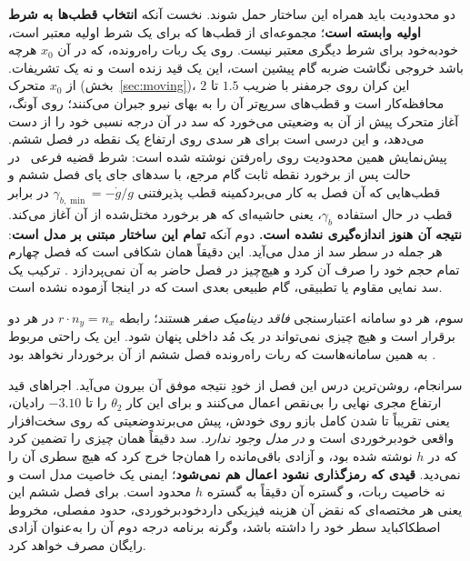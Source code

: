 \documentclass[10pt,twocolumn]{article}
\newcommand{\en}[1]{\lr{#1}}
\newcommand{\md}{\lr{\textemdash}}
\newcommand{\nd}{\lr{\textendash}}
\begin{document}
دو محدودیت باید همراه این ساختار حمل شوند. نخست آنکه \textbf{انتخاب قطب‌ها به
شرط اولیه وابسته است}؛ مجموعه‌ای از قطب‌ها که برای یک شرط اولیه معتبر است،
خودبه‌خود برای شرط دیگری معتبر نیست. روی یک ربات راه‌رونده، که در آن $x_0$ هرچه
باشد خروجی نگاشت ضربه گام پیشین است، این یک قید زنده است و نه یک تشریفات. از
$x_0$ متحرک (بخش~\ref{sec:moving})، این کران روی جرم\nd{}فنر با ضریب $1.5$ تا $2$
محافظه‌کار است و قطب‌های سریع‌تر آن را به بهای نیرو جبران می‌کنند؛ روی آونگ، آغاز
متحرک پیش از آن به وضعیتی می‌خورد که سد در آن درجه نسبی خود را از دست می‌دهد، و این
درسی است برای هر سدی روی ارتفاع یک نقطه در فصل ششم. پیش‌نمایش همین محدودیت روی راه‌رفتن
نوشته شده است: شرط قضیه فرعی~\en{5.2} در حالت پس از برخورد نقطه ثابت گام مرجع، با سدهای
جای پای فصل ششم و قطب‌هایی که آن فصل به کار می‌برد\md{}کمینه قطب پذیرفتنی
$\gamma_{b,\min}=-\dot g/g$ در برابر قطب در حال استفاده $\gamma_b$، یعنی حاشیه‌ای که هر
برخورد مختل‌شده از آن آغاز می‌کند. \textbf{نتیجه آن هنوز اندازه‌گیری نشده است.} دوم
آنکه \textbf{تمام این ساختار مبتنی بر مدل است}: هر جمله در سطر سد از مدل
می‌آید. این دقیقاً همان شکافی است که فصل چهارم تمام حجم خود را صرف آن کرد و
هیچ‌چیز در فصل حاضر به آن نمی‌پردازد \cite{xu2015robustness}. ترکیب یک سد نمایی
مقاوم یا تطبیقی، گام طبیعی بعدی است که در اینجا آزموده نشده است.

سوم، هر دو سامانه اعتبارسنجی \emph{فاقد دینامیک صفر} هستند؛ رابطه
$r\cdot n_y = n_x$ در هر دو برقرار است و هیچ چیزی نمی‌تواند در یک مُد داخلی
پنهان شود. این یک راحتی مربوط به همین سامانه‌هاست که ربات راه‌رونده فصل ششم از
آن برخوردار نخواهد بود \cite{westervelt2007feedback}.

سرانجام، روشن‌ترین درس این فصل از خودِ نتیجه موفق آن بیرون می‌آید. اجراهای
\en{ECBF} قید ارتفاع مجری نهایی را بی‌نقص اعمال می‌کنند و برای این کار
$\theta_2$ را تا $-3.10$ رادیان، یعنی تقریباً تا شدن کامل بازو روی خودش، پیش
می‌برند\md{}وضعیتی که روی سخت‌افزار واقعی خودبرخوردی است و \emph{در مدل وجود
ندارد}. سد دقیقاً همان چیزی را تضمین کرد که در $h$ نوشته شده بود، و آزادی
باقی‌مانده را همان‌جا خرج کرد که هیچ سطری آن را نمی‌دید. \textbf{قیدی که
رمزگذاری نشود اعمال هم نمی‌شود}؛ ایمنی یک خاصیت مدل است و نه خاصیت ربات، و
گستره آن دقیقاً به گستره $h$ محدود است. برای فصل ششم این یعنی هر مختصه‌ای که
نقض آن هزینه فیزیکی دارد\md{}خودبرخوردی، حدود مفصلی، مخروط اصطکاک\md{}باید سطر
خود را داشته باشد، وگرنه برنامه درجه دوم آن را به‌عنوان آزادی رایگان مصرف
خواهد کرد.

\begin{LTR}
\printbibliography[title={مراجع}]
\end{LTR}
\end{document}
